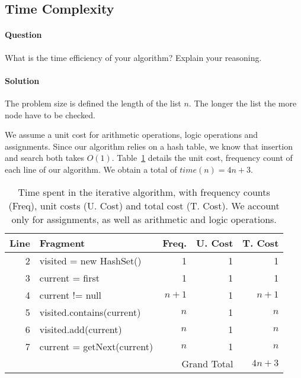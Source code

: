 \documentclass{article}
\begin{document}
\subsection{Time Complexity}
\paragraph{Question} What is the time efficiency of your algorithm?
Explain your reasoning.

\paragraph{Solution}

The problem size is defined the length of the list $n$. The longer the
list the more node have to be checked.

We assume a unit cost for arithmetic operations, logic operations and
assignments. Since our algorithm relies on a hash table, we know that
insertion and search both takes $O(1)$. Table~\ref{tab:iterative:time}
details the unit cost, frequency count of each line of our
algorithm. We obtain a total of $time(n) = 4n +3$.

\begin{table}[htbp]
  \begin{center}
    \begin{tabular}{r >{\small\ttfamily}l r r r}
      \toprule
      Line & Fragment & Freq. & U. Cost & T. Cost \\
      \midrule
      2 & visited = new HashSet() & 1 & 1 & 1 \\ 
      3 & current = first &  1 & 1 & 1 \\
      4 & current != null & $n+1$ & 1 & $n + 1$ \\
      5 & visited.contains(current) & $n$ & 1 & $n$ \\
      6 & visited.add(current) & $n$ & 1 & $n$ \\
      7 & current = getNext(current) & $n$ & 1 & $n$ \\
      \midrule
           & & \multicolumn{2}{r}{Grand Total} & $4n + 3$ \\
      \bottomrule
    \end{tabular}
  \end{center}
  \caption{Time spent in the iterative algorithm, with frequency
    counts (Freq), unit costs (U. Cost) and total cost (T. Cost). We
    account only for assignments, as well as arithmetic and logic
    operations.}
  \label{tab:iterative:time}
\end{table}
\end{document}
